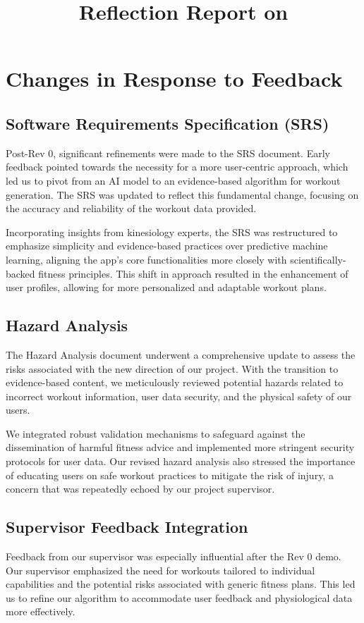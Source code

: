 \documentclass{article}
\title{Reflection Report on \progname}
\author{\authname}
\date{}
\begin{document}
\maketitle


\section{Changes in Response to Feedback}


\subsection{Software Requirements Specification (SRS)}
Post-Rev 0, significant refinements were made to the SRS document. Early feedback pointed towards the necessity for a more user-centric approach, which led us to pivot from an AI model to an evidence-based algorithm for workout generation. The SRS was updated to reflect this fundamental change, focusing on the accuracy and reliability of the workout data provided.

Incorporating insights from kinesiology experts, the SRS was restructured to emphasize simplicity and evidence-based practices over predictive machine learning, aligning the app's core functionalities more closely with scientifically-backed fitness principles. This shift in approach resulted in the enhancement of user profiles, allowing for more personalized and adaptable workout plans.

\subsection{Hazard Analysis}
The Hazard Analysis document underwent a comprehensive update to assess the risks associated with the new direction of our project. With the transition to evidence-based content, we meticulously reviewed potential hazards related to incorrect workout information, user data security, and the physical safety of our users.

We integrated robust validation mechanisms to safeguard against the dissemination of harmful fitness advice and implemented more stringent security protocols for user data. Our revised hazard analysis also stressed the importance of educating users on safe workout practices to mitigate the risk of injury, a concern that was repeatedly echoed by our project supervisor.

\subsection{Supervisor Feedback Integration}
Feedback from our supervisor was especially influential after the Rev 0 demo. Our supervisor emphasized the need for workouts tailored to individual capabilities and the potential risks associated with generic fitness plans. This led us to refine our algorithm to accommodate user feedback and physiological data more effectively.
\end{document}
